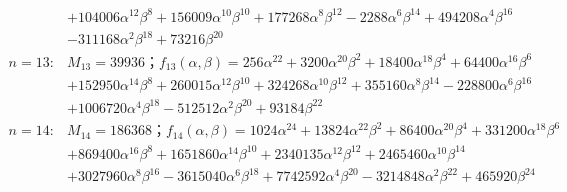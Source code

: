 \begin{flushleft}
\begin{align*}
&+104006\alpha^{12}\beta^{8}+156009\alpha^{10}\beta^{10}+177268\alpha^8\beta^{12}-2288\alpha^6\beta^{14}+494208\alpha^4\beta^{16}\\ &-311168\alpha^2\beta^{18}+73216\beta^{20}\\
n=13:&M_{13}=39936；f_{13}(\alpha,\beta)=256\alpha^{22}+3200\alpha^{20}\beta^2+18400\alpha^{18}\beta^4+64400\alpha^{16}\beta^6\\ 
&+152950\alpha^{14}\beta^{8}+260015\alpha^{12}\beta^{10}+324268\alpha^{10}\beta^{12}+355160\alpha^8\beta^{14}-228800\alpha^6\beta^{16}\\ &+1006720\alpha^4\beta^{18}-512512\alpha^2\beta^{20}+93184\beta^{22} \\
n=14:&M_{14}=186368；f_{14}(\alpha,\beta)=1024\alpha^{24}+13824\alpha^{22}\beta^2+86400\alpha^{20}\beta^4+331200\alpha^{18}\beta^6\\ 
&+869400\alpha^{16}\beta^{8}+1651860\alpha^{14}\beta^{10}+2340135\alpha^{12}\beta^{12}+2465460\alpha^{10}\beta^{14}\\ &+3027960\alpha^8\beta^{16}-3615040\alpha^6\beta^{18}+7742592\alpha^4\beta^{20}-3214848\alpha^2\beta^{22}+465920\beta^{24}\\
\end{align*}
\end{flushleft}
\newpage

